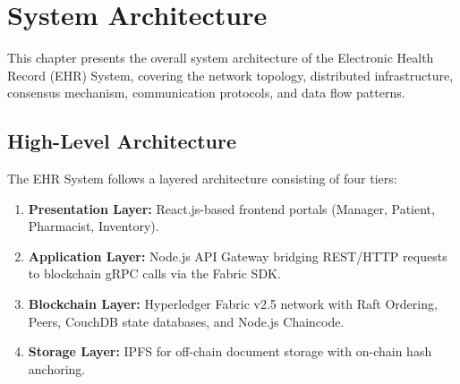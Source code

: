 \chapter{System Architecture}

This chapter presents the overall system architecture of the Electronic Health Record (EHR) System, covering the network topology, distributed infrastructure, consensus mechanism, communication protocols, and data flow patterns.

\section{High-Level Architecture}

The EHR System follows a layered architecture consisting of four tiers:

\begin{enumerate}
    \item \textbf{Presentation Layer:} React.js-based frontend portals (Manager, Patient, Pharmacist, Inventory).
    \item \textbf{Application Layer:} Node.js API Gateway bridging REST/HTTP requests to blockchain gRPC calls via the Fabric SDK.
    \item \textbf{Blockchain Layer:} Hyperledger Fabric v2.5 network with Raft Ordering, Peers, CouchDB state databases, and Node.js Chaincode.
    \item \textbf{Storage Layer:} IPFS for off-chain document storage with on-chain hash anchoring.
\end{enumerate}

